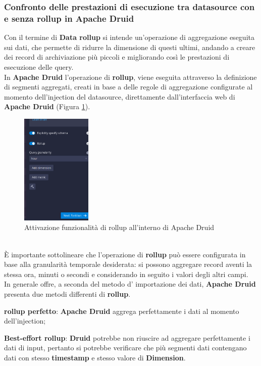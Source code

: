 \subsubsection{Confronto delle prestazioni di esecuzione tra datasource con e senza rollup in Apache Druid}\label{sec:confronto_prestazioni2}
Con il termine di \textbf{Data rollup} si intende un'operazione di aggregazione eseguita 
sui dati, che permette di ridurre la dimensione di questi ultimi, andando a creare dei record di archiviazione più piccoli e migliorando così 
le prestazioni di esecuzione delle query.\\
In \textbf{Apache Druid} l'operazione di \textbf{rollup}, viene eseguita attraverso la 
definizione di segmenti aggregati, creati in base a delle regole di aggregazione configurate al momento dell'\gls{injection}{} del \gls{datasource}{}, direttamente dall'interfaccia web di \textbf{Apache Druid} (Figura \ref{fig:rollup}).
\begin{figure}[h]
  \centering
  \includegraphics[width=0.3\textwidth]{images/percorso/test_rollup.png}
  \caption{Attivazione funzionalità di rollup all'interno di Apache Druid}
  \label{fig:rollup}
\end{figure}
\\
È importante sottolineare che l'operazione di \textbf{rollup} può essere configurata in base 
alla granularità temporale desiderata: si possono aggregare record aventi la stessa ora, minuti o secondi e considerando in seguito i  valori degli altri campi.\\
In generale offre, a seconda del metodo d' importazione dei dati, \textbf{Apache Druid} presenta due metodi differenti di \textbf{rollup}.
\begin{list}{*}
  \item \textbf{rollup  perfetto}: \textbf{Apache Druid} aggrega perfettamente i dati al momento dell'\gls{injection}{};
  \item \item \textbf{Best-effort rollup}: \textbf{Druid} potrebbe non riuscire ad aggregare perfettamente i dati 
  di input, pertanto si potrebbe verificare che più segmenti dati contengano dati con
  stesso \textbf{timestamp} e stesso valore di \textbf{Dimension}.
\end{list}
